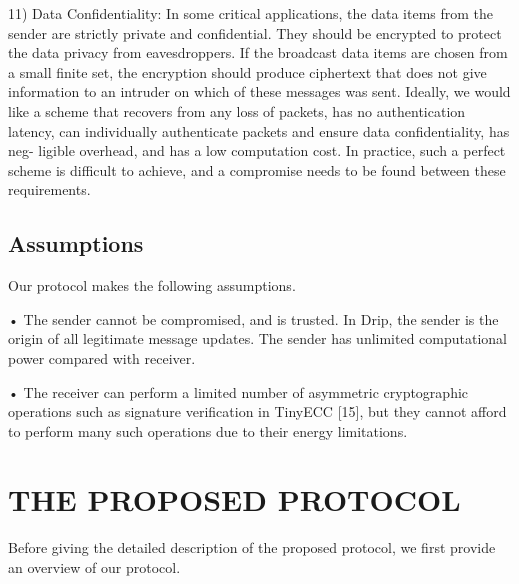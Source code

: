 \documentclass[lnicst,sechang,a4paper]{svmultln}
\begin{document}
11) Data Confidentiality: In some critical applications, the
data items from the sender are strictly private and
confidential. They should be encrypted to protect the
data privacy from eavesdroppers. If the broadcast data
items are chosen from a small finite set, the encryption
should produce ciphertext that does not give information
to an intruder on which of these messages was sent.
Ideally, we would like a scheme that recovers from any
loss of packets, has no authentication latency, can individually
authenticate packets and ensure data confidentiality, has neg-
ligible overhead, and has a low computation cost. In practice,
such a perfect scheme is difficult to achieve, and a compromise
needs to be found between these requirements.
\subsection{Assumptions}
Our protocol makes the following assumptions.

• The sender cannot be compromised, and is trusted. In
Drip, the sender is the origin of all legitimate message
updates. The sender has unlimited computational power
compared with receiver.

• The receiver can perform a limited number of asymmetric
cryptographic operations such as signature verification in
TinyECC [15], but they cannot afford to perform many
such operations due to their energy limitations.

\section{THE PROPOSED PROTOCOL}
Before giving the detailed description of the proposed
protocol, we first provide an overview of our protocol.
\end{document}

